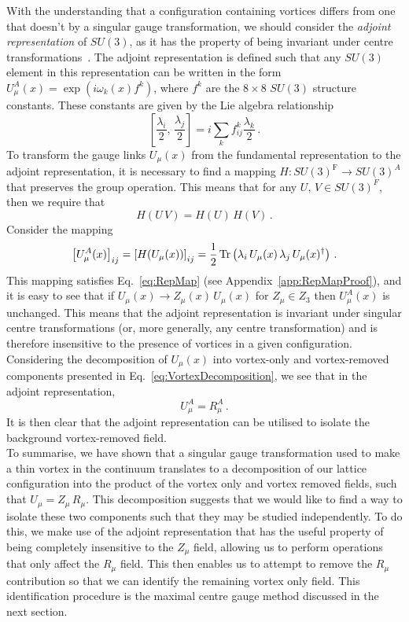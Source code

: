 With the understanding that a configuration containing vortices differs from one that doesn't by a singular gauge transformation, we should consider the \textit{adjoint representation} of $SU(3)$, as it has the property of being invariant under centre transformations~\cite{Faber:1999gu}. The adjoint representation is defined such that any $SU(3)$ element in this representation can be written in the form $U^A_\mu(x) = \exp\left(i \omega_k(x) f^k\right)$, where $f^k$ are the $8\times 8$ $SU(3)$ structure constants. These constants are given by the Lie algebra relationship
%
\begin{equation}
\left[\frac{\lambda_i}{2},\,\frac{\lambda_j}{2}\right] = i\sum_k f_{ij}^{k}\frac{\lambda_k}{2}\, .
\end{equation}
%
To transform the gauge links $U_\mu(x)$ from the fundamental representation to the adjoint representation, it is necessary to find a mapping $H:SU(3)^\text{F}\rightarrow SU(3)^A$ that preserves the group operation. This means that for any $U,\,V \in SU(3)^F$, then we require that
%
\begin{equation}
H(U\,V) = H(U)\,H(V)\, .
\label{eq:RepMap}
\end{equation}
%
Consider the mapping
%
\begin{equation}
\left[U_\mu^A(x)\right]_{ij} = \left[H(U_\mu(x))\right]_{ij} = \frac{1}{2}\operatorname{Tr}\left(\lambda_i \, U_\mu(x) \, \lambda_j\, U_\mu(x)^\dagger\right)\, .
\label{eq:AdjointRep}
\end{equation}
%
This mapping satisfies Eq.~\eqref{eq:RepMap} (see Appendix~\ref{app:RepMapProof}), and it is easy to see that if $U_\mu(x)\rightarrow Z_\mu(x)\, U_\mu(x)$ for $Z_\mu\in Z_3$ then $U^A_\mu(x)$ is unchanged. This means that the adjoint representation is invariant under singular centre transformations (or, more generally, any centre transformation) and is therefore insensitive to the presence of vortices in a given configuration. Considering the decomposition of $U_\mu(x)$ into vortex-only and vortex-removed components presented in Eq.~\eqref{eq:VortexDecomposition}, we see that in the adjoint representation, 
%
\begin{equation}
U_\mu^A = R_\mu^A\, .
\end{equation}
%
It is then clear that the adjoint representation can be utilised to isolate the background vortex-removed field.\\

To summarise, we have shown that a singular gauge transformation used to make a thin vortex in the continuum translates to a decomposition of our lattice configuration into the product of the vortex only and vortex removed fields, such that $U_\mu = Z_\mu\,R_\mu$. This decomposition suggests that we would like to find a way to isolate these two components such that they may be studied independently. To do this, we make use of the adjoint representation that has the useful property of being completely insensitive to the $Z_\mu$ field, allowing us to perform operations that only affect the $R_\mu$ field. This then enables us to attempt to remove the $R_\mu$ contribution so that we can identify the remaining vortex only field. This identification procedure is the maximal centre gauge method discussed in the next section. 
 
